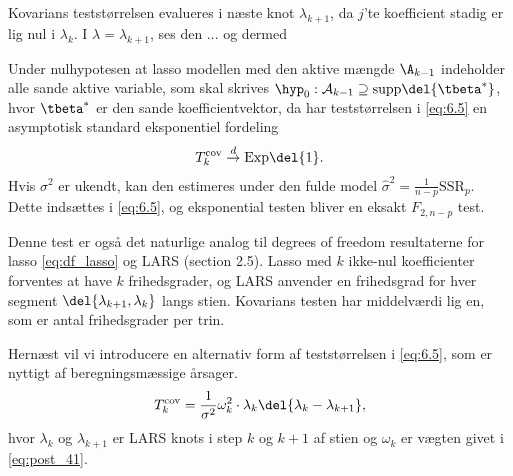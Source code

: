 Kovarians teststørrelsen evalueres i næste knot \(\lambda_{k+1}\), da \(j\)'te koefficient stadig er lig nul i \(\lambda_k\).
I \(\lambda = \lambda_{k+1}\), ses den ...
 og dermed

Under nulhypotesen at lasso modellen med den aktive mængde \(\A_{k-1}\) indeholder alle sande aktive variable, som skal skrives \(\hyp_0: \mathcal{A}_{k-1} \supseteq \text{supp} \del{\tbeta^*}\), hvor \(\tbeta^*\) er den sande koefficientvektor, da har teststørrelsen i \eqref{eq:6.5} en asymptotisk standard eksponentiel fordeling
\begin{align*}
T_k^\text{cov} \overset{d}{\rightarrow} \text{Exp}\del{1}.
\end{align*}
Hvis \(\sigma^2\) er ukendt, kan den estimeres under den fulde model \(\hat{\sigma}^2 = \frac{1}{n-p} \text{SSR}_p\). 
Dette indsættes i \eqref{eq:6.5}, og eksponential testen bliver en eksakt \(F_{2,n-p}\) test.

Denne test er også det naturlige analog til degrees of freedom resultaterne for lasso \eqref{eq:df_lasso} og LARS (section 2.5).
Lasso med \(k\) ikke-nul koefficienter forventes at have \(k\) frihedsgrader, og LARS anvender en frihedsgrad for hver segment \(\del{\lambda_{k+1}, \lambda_k}\) langs stien.
Kovarians testen har middelværdi lig en, som er antal frihedsgrader per trin.
%

Hernæst vil vi introducere en alternativ form af teststørrelsen i \eqref{eq:6.5}, som er nyttigt af beregningsmæssige årsager.
\begin{align*}
T_k^\text{cov} = \frac{1}{\sigma^2} \omega_k^2 \cdot \lambda_k \del{\lambda_k - \lambda_{k+1}},
\end{align*}
hvor \(\lambda_k\) og \(\lambda_{k+1}\) er LARS knots i step \(k\) og \(k+1\) af stien og \(\omega_k\) er vægten givet i \eqref{eq:post_41}.



